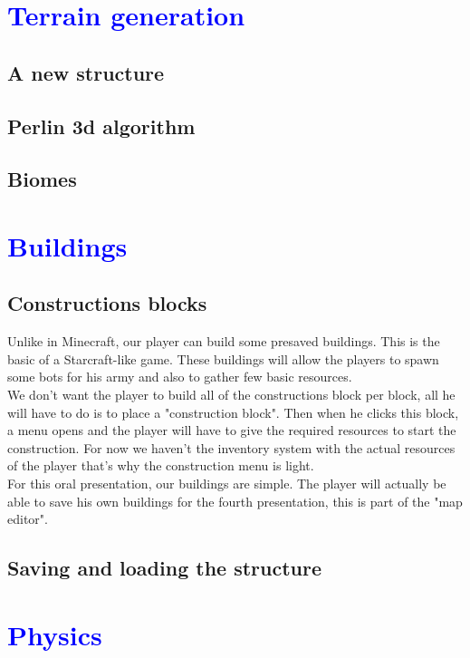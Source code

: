 \documentclass[article]{report} %
\begin{document}
		\chapter{\textcolor{blue}{Terrain generation}}
			\section{A new structure}
				
			\section{Perlin 3d algorithm}
				
			\section{Biomes}
			
		\chapter{\textcolor{blue}{Buildings}}
			\section{Constructions blocks}
				Unlike in Minecraft, our player can build some presaved buildings. This is the basic of a Starcraft-like game. These buildings will allow the players to spawn some bots for his army and also to gather few basic resources.\\

We don't want the player to build all of the constructions block per block, all he will have to do is to place a "construction block". Then when he clicks this block, a menu opens and the player will have to give the required resources to start the construction. For now we haven't the inventory system with the actual resources of the player that's why the construction menu is light.\\

For this oral presentation, our buildings are simple. The player will actually be able to save his own buildings for the fourth presentation, this is part of the "map editor".
			
			\section{Saving and loading the structure}
			
		\chapter{\textcolor{blue}{Physics}}
\end{document}
